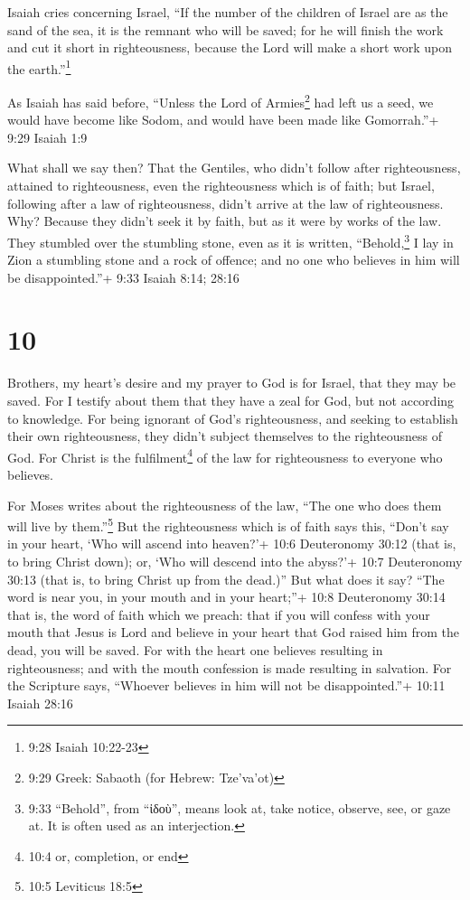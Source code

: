  Isaiah cries concerning Israel, ``If the number of the
children of Israel are as the sand of the sea, it is the remnant who
will be saved;  for he will finish the work and cut it
short in righteousness, because the Lord will make a short work upon the
earth.''\footnote{9:28 Isaiah 10:22-23}

 As Isaiah has said before, ``Unless the Lord of
Armies\footnote{9:29 Greek: Sabaoth (for Hebrew: Tze'va'ot)} had left us
a seed, we would have become like Sodom, and would have been made like
Gomorrah.''+ 9:29 Isaiah 1:9

 What shall we say then? That the Gentiles, who didn't
follow after righteousness, attained to righteousness, even the
righteousness which is of faith;  but Israel, following
after a law of righteousness, didn't arrive at the law of righteousness.
 Why? Because they didn't seek it by faith, but as it were
by works of the law. They stumbled over the stumbling stone,
 even as it is written, ``Behold,\footnote{9:33 ``Behold'',
  from ``ἰδοὺ'', means look at, take notice, observe, see, or gaze at.
  It is often used as an interjection.} I lay in Zion a stumbling stone
and a rock of offence; and no one who believes in him will be
disappointed.''+ 9:33 Isaiah 8:14; 28:16

\hypertarget{section-9}{%
\section{10}\label{section-9}}

 Brothers, my heart's desire and my prayer to God is for
Israel, that they may be saved.  For I testify about them
that they have a zeal for God, but not according to knowledge.
 For being ignorant of God's righteousness, and seeking to
establish their own righteousness, they didn't subject themselves to the
righteousness of God.  For Christ is the
fulfilment\footnote{10:4 or, completion, or end} of the law for
righteousness to everyone who believes.

 For Moses writes about the righteousness of the law, ``The
one who does them will live by them.''\footnote{10:5 Leviticus 18:5}
 But the righteousness which is of faith says this, ``Don't
say in your heart, `Who will ascend into heaven?'+ 10:6 Deuteronomy
30:12 (that is, to bring Christ down);  or, `Who will
descend into the abyss?'+ 10:7 Deuteronomy 30:13 (that is, to bring
Christ up from the dead.)''  But what does it say? ``The
word is near you, in your mouth and in your heart;''+ 10:8 Deuteronomy
30:14 that is, the word of faith which we preach:  that if
you will confess with your mouth that Jesus is Lord and believe in your
heart that God raised him from the dead, you will be saved.
 For with the heart one believes resulting in
righteousness; and with the mouth confession is made resulting in
salvation.  For the Scripture says, ``Whoever believes in
him will not be disappointed.''+ 10:11 Isaiah 28:16

